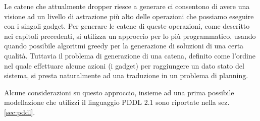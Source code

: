 Le catene che attualmente dropper riesce a generare ci consentono di
avere una visione ad un livello di astrazione più alto delle
operazioni che possiamo eseguire con i singoli gadget. Per generare le
catene di queste operazioni, come descritto nei capitoli precedenti,
si utilizza un approccio per lo più programmatico, usando quando
possibile algoritmi greedy per la generazione di soluzioni di una
certa qualità. Tuttavia il problema di generazione di una catena,
definito come l'ordine nel quale effettuare alcune azioni (i gadget)
per raggiungere un dato stato del sistema, si presta naturalmente ad
una traduzione in un problema di planning.

Alcune considerazioni su questo approccio, insieme ad una prima
possibile modellazione che utilizzi il linguaggio PDDL 2.1
\cite{pddl-97,fox-03} sono riportate nella sez. \ref{sec:pddl}.

